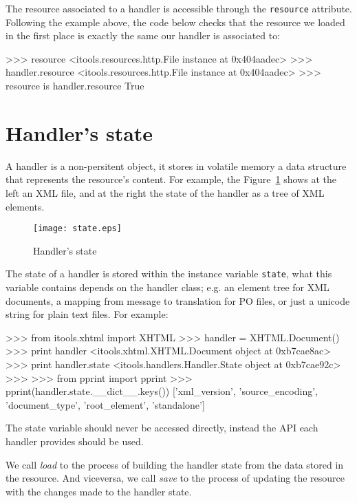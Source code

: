 The resource associated to a handler is accessible through the {\tt resource}
attribute. Following the example above, the code below checks that the
resource we loaded in the first place is exactly the same our handler is
associated to:

\begin{code}
    >>> resource
    <itools.resources.http.File instance at 0x404aadec>
    >>> handler.resource
    <itools.resources.http.File instance at 0x404aadec>
    >>> resource is handler.resource
    True
\end{code}


\section{Handler's state}

A handler is a non-persitent object, it stores in volatile memory a data
structure that represents the resource's content. For example, the
Figure~\ref{Figure: state} shows at the left an XML file, and at the
right the state of the handler as a tree of XML elements.

\begin{figure}
  \center
  \texttt{[image: state.eps]}
  \caption{Handler's state}
  \label{Figure: state}
\end{figure}

The state of a handler is stored within the instance variable {\tt state},
what this variable contains depends on the handler class; e.g. an element
tree for XML documents, a mapping from message to translation for PO files,
or just a unicode string for plain text files. For example:

\begin{code}
    >>> from itools.xhtml import XHTML
    >>> handler = XHTML.Document()
    >>> print handler
    <itools.xhtml.XHTML.Document object at 0xb7cae8ac>
    >>> print handler.state
    <itools.handlers.Handler.State object at 0xb7cae92c>
    >>>
    >>> from pprint import pprint
    >>> pprint(handler.state.__dict__.keys())
    ['xml_version',
     'source_encoding',
     'document_type',
     'root_element',
     'standalone']
\end{code}

The state variable should never be accessed directly, instead the API each
handler provides should be used.

We call {\em load} to the process of building the handler state from the
data stored in the resource. And viceversa, we call {\em save} to the
process of updating the resource with the changes made to the handler
state.


